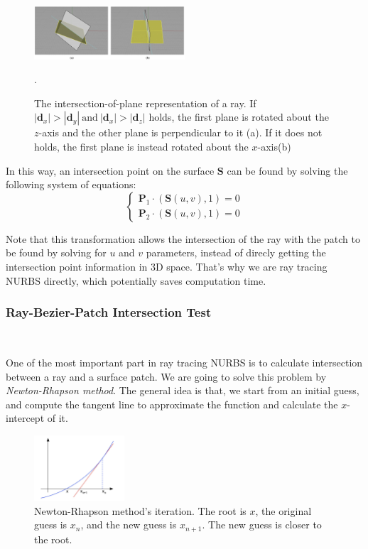 \documentclass[acmtog]{acmart}
\begin{document}
\begin{figure}[H]
	\centering
	\includegraphics[width=0.5\textwidth]{pictures/ray-plane.jpg}
	\caption{The intersection-of-plane representation of a ray. If $|\mathbf{d}_x| > |\mathbf{d}_y| \mathrm{\ and\ } |\mathbf{d}_x| > |\mathbf{d}_z|$ holds, the first plane is rotated about the $z$-axis and the other plane is perpendicular to it (a). If it does not holds, the first plane is instead rotated about the $x$-axis(b)}.
	\label{fig:ray-representation}
\end{figure}

In this way, an intersection point on the surface $\mathbf{S}$ can be found by solving the following system of equations:
\[\begin{cases}
	\mathbf{P}_1 \cdot (\mathbf{S}(u, v), 1) = 0\\
	\mathbf{P}_2 \cdot (\mathbf{S}(u, v), 1) = 0
\end{cases}\]

Note that this transformation allows the intersection of the ray with the patch to be found by solving for $u$ and $v$ parameters, instead of direcly getting the intersection point information in 3D space. That's why we are ray tracing NURBS directly, which potentially saves computation time.

\subsubsection{Ray-Bezier-Patch Intersection Test}

\ 

One of the most important part in ray tracing NURBS is to calculate intersection between a ray and a surface patch. We are going to solve this problem by \textit{Newton-Rhapson method}. The general idea is that, we start from an initial guess, and compute the tangent line to approximate the function and calculate the $x$-intercept of it. 

\begin{figure}[H]
	\centering
	\includegraphics[width=0.3\textwidth]{pictures/newton-iteration.jpg}
	\caption{Newton-Rhapson method's iteration. The root is $x$, the original guess is $x_n$, and the new guess is $x_{n+1}$. The new guess is closer to the root.}
\end{figure}
\end{document}

